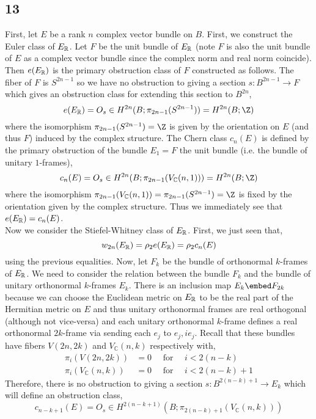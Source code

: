 \documentclass[12pt]{extarticle}
\newcommand{\C}{\mathbb{C}}
\begin{document}
\subsection{13}

First, let $E$ be a rank $n$ complex vector bundle on $B$. First, we construct the Euler class of $E_{\mathbb{R}}$. Let $F$ be the unit bundle of $E_{\mathbb{R}}$ (note $F$ is also the unit bundle of $E$ as a complex vector bundle since the complex norm and real norm coincide). Then $e(E_{\mathbb{R}})$ is the primary obstruction class of $F$ constructed as follows. The fiber of $F$ is $S^{2n - 1}$ so we have no obstruction to giving a section $s : B^{2n-1} \to F$ which gives an obstruction class for extending this section to $B^{2n}$,
\[ e(E_\R) = O_s \in H^{2n}(B; \pi_{2n-1}(S^{2n - 1})) = H^{2n}(B; \Z) \]
where the isomorphism $\pi_{2n - 1}(S^{2n - 1}) = \Z$ is given by the orientation on $E$ (and thus $F$) induced by the complex structure. The Chern class $c_n(E)$ is defined by the primary obstruction of the bundle $E_1 = F$ the unit bundle (i.e. the bundle of unitary $1$-frames),
\[ c_n(E) = O_s \in H^{2n}(B; \pi_{2n - 1}(V_\C(n, 1))) = H^{2n}(B; \Z) \]
where the isomorphism $\pi_{2n-1} (V_\C(n,1)) = \pi_{2n-1}(S^{2n - 1}) = \Z$ is fixed by the orientation given by the complex structure. Thus we immediately see that $e(E_{\mathbb{R}}) = c_n(E)$. 
\bigskip\\
Now we consider the Stiefel-Whitney class of $E_{\mathbb{R}}$. First, we just seen that,
\[ w_{2n}(E_{\mathbb{R}}) = \rho_2 e(E_{\mathbb{R}}) = \rho_2 c_n(E) \]
using the previous equalities. Now, let $F_k$ be the bundle of orthonormal $k$-frames of $E_{\mathbb{R}}$. We need to consider the relation between the bundle $F_k$ and the bundle of unitary orthonormal $k$-frames $E_k$. There is an inclusion map $E_k \embed F_{2k}$ because we can choose the Euclidean metric on $E_{\mathbb{R}}$ to be the real part of the Hermitian metric on $E$ and thus unitary orthonormal frames are real orthogonal (although not vice-versa) and each unitary orthonormal $k$-frame defines a real orthonormal $2k$-frame via sending each $e_j$ to $e_j, i e_j$. Recall that these bundles have fibers $V(2n, 2k)$ and $V_\C(n, k)$ respectively with,
\begin{align*}
\pi_i(V(2n, 2k)) &= 0 \quad \text{ for } \quad i < 2(n - k) 
\\
\pi_i(V_\C(n, k)) &= 0 \quad \text{ for } \quad i < 2 (n - k) + 1
\end{align*} 
Therefore, there is no obstruction to giving a section $s : B^{2 (n - k) + 1} \to E_k$ which will define an obstruction class,
\[ c_{n - k + 1}(E) = O_s \in H^{2(n - k + 1)}(B; \pi_{2(n - k) + 1}(V_\C(n, k))) \]
\end{document}
